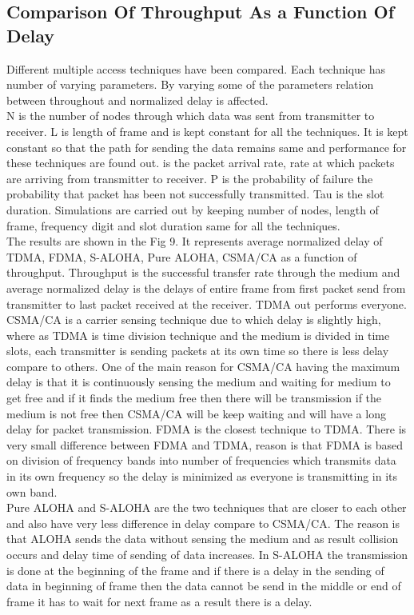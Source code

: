 \documentclass[11pt, conference, compsocconf, onecolumn]{IEEEtran}
\begin{document}
\subsection{Comparison Of Throughput As a Function Of Delay}
Different multiple access techniques have been compared. Each technique has number of varying parameters. By varying some of the parameters relation between throughout and normalized delay is affected.
\\
\indent N is the number of nodes through which data was sent from transmitter to receiver. L is length of frame and is kept constant for all the techniques. It is kept constant so that the path for sending the data remains same and performance for these techniques are found out.  is the packet arrival rate, rate at which packets are arriving from transmitter to receiver. P is the probability of failure the probability that packet has been not successfully transmitted. Tau is the slot duration. Simulations are carried out by keeping number of nodes, length of frame, frequency digit and slot duration same for all the techniques.
\\
\indent The results are shown in the Fig 9. It represents average normalized delay of TDMA, FDMA, S-ALOHA, Pure ALOHA, CSMA/CA as a function of throughput. Throughput is the successful transfer rate through the medium and average normalized delay is the delays of entire frame from first packet send from transmitter to last packet received at the receiver. TDMA out performs everyone.
\\
\indent CSMA/CA is a carrier sensing technique due to which delay is slightly high, where as TDMA is time division technique and the medium is divided in time slots, each transmitter is sending packets at its own time so there is less delay compare to others. One of the main reason for CSMA/CA having the maximum delay is that it is continuously sensing the medium and waiting for medium to get free and if it finds the medium free then there will be transmission if the medium is not free then CSMA/CA will be keep waiting and will have a long delay for packet transmission. FDMA is the closest technique to TDMA. There is very small difference between FDMA and TDMA, reason is that FDMA is based on division of frequency bands into number of frequencies which transmits data in its own frequency so the delay is minimized as everyone is transmitting in its own band.
\\
\indent Pure ALOHA and S-ALOHA are the two techniques that are closer to each other and also have very less difference in delay compare to CSMA/CA. The reason is that ALOHA sends the data without sensing the medium and as result collision occurs and delay time of sending of data increases. In S-ALOHA the transmission is done at the beginning of the frame and if there is a delay in the sending of data in beginning of frame then the data cannot be send in the middle or end of frame it has to wait for next frame as a result there is a delay.
\end{document}
